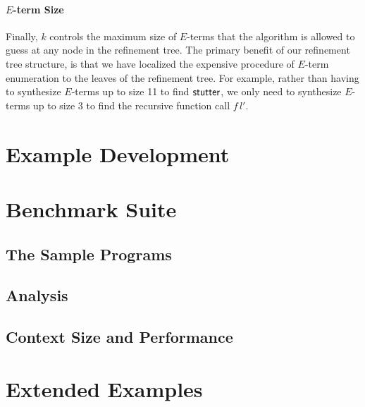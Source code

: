 \paragraph{$E$-term Size}
Finally, $k$ controls the maximum size of $E$-terms that the algorithm is allowed to guess at any node in the refinement tree.
The primary benefit of our refinement tree structure, is that we have localized the expensive procedure of $E$-term enumeration to the leaves of the refinement tree.
For example, rather than having to synthesize $E$-terms up to size 11 to find $\mathsf{stutter}$, we only need to synthesize $E$-terms up to size 3 to find the recursive function call $f\,l'$.

\section{Example Development}
\label{sec:example-development}

\section{Benchmark Suite}
\label{sec:benchmark-suite}

\subsection{The Sample Programs}
\label{subsec:the-sample-programs}

\subsection{Analysis}
\label{subsec:analysis}

\subsection{Context Size and Performance}
\label{subsec:context-size-and-performance}

\section{Extended Examples}
\label{sec:extended-examples}
